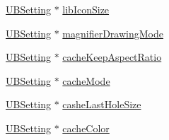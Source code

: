 \begin{DoxyCompactItemize}
\item 
\hyperlink{class_u_b_setting}{U\-B\-Setting} $\ast$ \hyperlink{class_u_b_settings_a99e641a68f671ef213d2936828d537e2}{lib\-Icon\-Size}
\item 
\hyperlink{class_u_b_setting}{U\-B\-Setting} $\ast$ \hyperlink{class_u_b_settings_a82c958efcb6a1f1e49062fb06aaf388d}{magnifier\-Drawing\-Mode}
\item 
\hyperlink{class_u_b_setting}{U\-B\-Setting} $\ast$ \hyperlink{class_u_b_settings_a4ac160520db65a8179a1f23f3692bd39}{cache\-Keep\-Aspect\-Ratio}
\item 
\hyperlink{class_u_b_setting}{U\-B\-Setting} $\ast$ \hyperlink{class_u_b_settings_ad55a1c27f720ce9ff548ef80d784ee03}{cache\-Mode}
\item 
\hyperlink{class_u_b_setting}{U\-B\-Setting} $\ast$ \hyperlink{class_u_b_settings_a34d0e6aa27365de82ac42191d4faf9a6}{cashe\-Last\-Hole\-Size}
\item 
\hyperlink{class_u_b_setting}{U\-B\-Setting} $\ast$ \hyperlink{class_u_b_settings_ac08df540708d2636d25fed0bf04c8392}{cache\-Color}
\end{DoxyCompactItemize}
